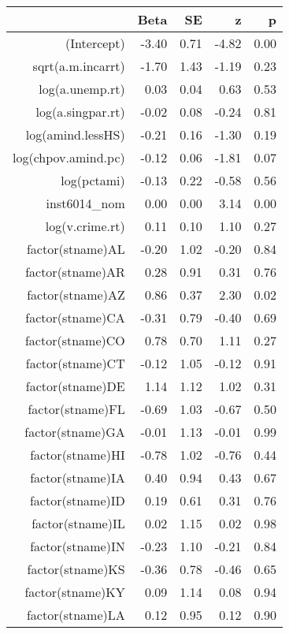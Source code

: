 \begin{table}[ht]
\centering
\begin{tabular}{rrrrr}
  \hline
 & Beta & SE & z & p \\ 
  \hline
(Intercept) & -3.40 & 0.71 & -4.82 & 0.00 \\ 
  sqrt(a.m.incarrt) & -1.70 & 1.43 & -1.19 & 0.23 \\ 
  log(a.unemp.rt) & 0.03 & 0.04 & 0.63 & 0.53 \\ 
  log(a.singpar.rt) & -0.02 & 0.08 & -0.24 & 0.81 \\ 
  log(amind.lessHS) & -0.21 & 0.16 & -1.30 & 0.19 \\ 
  log(chpov.amind.pc) & -0.12 & 0.06 & -1.81 & 0.07 \\ 
  log(pctami) & -0.13 & 0.22 & -0.58 & 0.56 \\ 
  inst6014\_nom & 0.00 & 0.00 & 3.14 & 0.00 \\ 
  log(v.crime.rt) & 0.11 & 0.10 & 1.10 & 0.27 \\ 
  factor(stname)AL & -0.20 & 1.02 & -0.20 & 0.84 \\ 
  factor(stname)AR & 0.28 & 0.91 & 0.31 & 0.76 \\ 
  factor(stname)AZ & 0.86 & 0.37 & 2.30 & 0.02 \\ 
  factor(stname)CA & -0.31 & 0.79 & -0.40 & 0.69 \\ 
  factor(stname)CO & 0.78 & 0.70 & 1.11 & 0.27 \\ 
  factor(stname)CT & -0.12 & 1.05 & -0.12 & 0.91 \\ 
  factor(stname)DE & 1.14 & 1.12 & 1.02 & 0.31 \\ 
  factor(stname)FL & -0.69 & 1.03 & -0.67 & 0.50 \\ 
  factor(stname)GA & -0.01 & 1.13 & -0.01 & 0.99 \\ 
  factor(stname)HI & -0.78 & 1.02 & -0.76 & 0.44 \\ 
  factor(stname)IA & 0.40 & 0.94 & 0.43 & 0.67 \\ 
  factor(stname)ID & 0.19 & 0.61 & 0.31 & 0.76 \\ 
  factor(stname)IL & 0.02 & 1.15 & 0.02 & 0.98 \\ 
  factor(stname)IN & -0.23 & 1.10 & -0.21 & 0.84 \\ 
  factor(stname)KS & -0.36 & 0.78 & -0.46 & 0.65 \\ 
  factor(stname)KY & 0.09 & 1.14 & 0.08 & 0.94 \\ 
  factor(stname)LA & 0.12 & 0.95 & 0.12 & 0.90 \\ 

\end{tabular}
\end{table}
